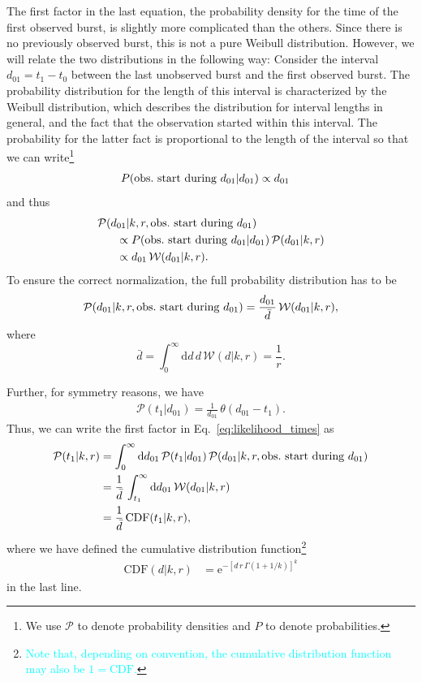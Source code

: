 \documentclass[fleqn,usenatbib]{mnras}
\newcommand{\new}[1]{\textcolor{cyan}{#1}}
\begin{document}
The first factor in the last equation, the probability density for the time of the first observed burst, is slightly more complicated than the others. Since there is no previously observed burst, this is not a pure Weibull distribution. However, we will relate the two distributions in the following way: Consider the interval $d_{01} = t_1 - t_0$ between the last unobserved burst and the first observed burst. The probability distribution for the length of this interval is characterized by the Weibull distribution, which describes the distribution for interval lengths in general, and the fact that the observation started within this interval. The probability for the latter fact is proportional to the length of the interval so that we can write\footnote{We use $\mathcal{P}$ to denote probability densities and $P$ to denote probabilities.}
\begin{align}
	P(\textnormal{obs.\ start during }d_{01} | d_{01}) &\propto d_{01}
\end{align}
and thus
\begin{align}
	&\mathcal{P}(d_{01}|k,r,\textnormal{obs.\ start during }d_{01})\nonumber\\
	&~~~~~\propto P(\textnormal{obs.\ start during }d_{01}|d_{01}) \, \mathcal{P}(d_{01}|k,r)\nonumber\\
	&~~~~~\propto d_{01} \, \mathcal{W}(d_{01}|k,r).
\end{align}
To ensure the correct normalization, the full probability distribution has to be
\begin{align}
	\mathcal{P}(d_{01}|k,r,\textnormal{obs.\ start during }d_{01}) = \frac{d_{01}}{\bar{d}} \, \mathcal{W}(d_{01}|k,r),
\end{align}
where
\begin{equation}
	\label{eq:dbar_weibull}
	\bar{d} = \int_0^\infty \mathrm{d}d \, d \, \mathcal{W}(d|k,r) = \frac{1}{r}.
\end{equation}

Further, for symmetry reasons, we have
\begin{align}
 \mathcal{P}(t_1|d_{01}) = \frac{1}{d_{01}} \, \theta(d_{01} - t_1).
\end{align}
Thus, we can write the first factor in Eq.~\eqref{eq:likelihood_times} as
\begin{align}
	\mathcal{P}(t_1|k,r) &= \int_0^\infty \mathrm{d}d_{01} \, \mathcal{P}(t_1|d_{01}) \, \mathcal{P}(d_{01}|k,r,\textnormal{obs.\ start during }d_{01})\nonumber\\
	&= \frac{1}{\bar{d}} \, \int_{t_1}^\infty \mathrm{d}d_{01} \, \mathcal{W}(d_{01}|k,r)\nonumber\\
	&= \frac{1}{\bar{d}} \, \mathrm{CDF}(t_1|k,r),
\end{align}
where we have defined the cumulative distribution function\footnote{\new{Note that, depending on convention, the cumulative distribution function may also be $1 = \mathrm{CDF}$.}}
\begin{align}
	\label{eq:cdf_weibull}
	\mathrm{CDF}(d|k,r) &= \mathrm{e}^{-\left[d\,r\,\Gamma(1 + 1/k)\right]^k}
\end{align}
in the last line.
\end{document}
